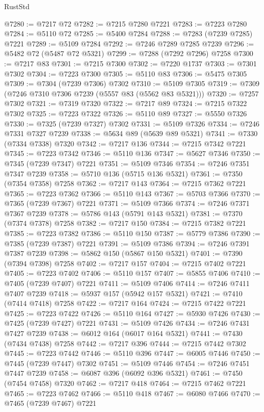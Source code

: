 \begin{lexlean}{RustStd}
\begin{coremodule}
@7280 := @7217 @72
@7282 := @7215 @7280 @7221
@7283 := @7223 @7280
@7284 := @5110 @72
@7285 := @5400 @7284
@7288 := @7283 (@7239 @7285) @7221
@7289 := @5109 @7284
@7292 := @7246 @7289 @7285 @7239
@7296 := @5482 @72 (@5487 @72 @5321)
@7299 := @7288 (@7292 @7296) @7258
@7300 := @7217 @83
@7301 := @7215 @7300
@7302 := @7220 @1737
@7303 := @7301 @7302
@7304 := @7223 @7300
@7305 := @5110 @83
@7306 := @5475 @7305
@7309 := @7304 (@7239 @7306) @7302
@7310 := @5109 @7305
@7319 := @7309 (@7246 @7310 @7306 @7239 (@5557 @83 (@5562 @83 @5321)))
@7320 := @7257 @7302
@7321 := @7319 @7320
@7322 := @7217 @89
@7324 := @7215 @7322 @7302
@7325 := @7223 @7322
@7326 := @5110 @89
@7327 := @5550 @7326
@7330 := @7325 (@7239 @7327) @7302
@7331 := @5109 @7326
@7334 := @7246 @7331 @7327 @7239
@7338 := @5634 @89 (@5639 @89 @5321)
@7341 := @7330 (@7334 @7338) @7320
@7342 := @7217 @136
@7344 := @7215 @7342 @7221
@7345 := @7223 @7342
@7346 := @5110 @136
@7347 := @5627 @7346
@7350 := @7345 (@7239 @7347) @7221
@7351 := @5109 @7346
@7354 := @7246 @7351 @7347 @7239
@7358 := @5710 @136 (@5715 @136 @5321)
@7361 := @7350 (@7354 @7358) @7258
@7362 := @7217 @143
@7364 := @7215 @7362 @7221
@7365 := @7223 @7362
@7366 := @5110 @143
@7367 := @5703 @7366
@7370 := @7365 (@7239 @7367) @7221
@7371 := @5109 @7366
@7374 := @7246 @7371 @7367 @7239
@7378 := @5786 @143 (@5791 @143 @5321)
@7381 := @7370 (@7374 @7378) @7258
@7382 := @7217 @150
@7384 := @7215 @7382 @7221
@7385 := @7223 @7382
@7386 := @5110 @150
@7387 := @5779 @7386
@7390 := @7385 (@7239 @7387) @7221
@7391 := @5109 @7386
@7394 := @7246 @7391 @7387 @7239
@7398 := @5862 @150 (@5867 @150 @5321)
@7401 := @7390 (@7394 @7398) @7258
@7402 := @7217 @157
@7404 := @7215 @7402 @7221
@7405 := @7223 @7402
@7406 := @5110 @157
@7407 := @5855 @7406
@7410 := @7405 (@7239 @7407) @7221
@7411 := @5109 @7406
@7414 := @7246 @7411 @7407 @7239
@7418 := @5937 @157 (@5942 @157 @5321)
@7421 := @7410 (@7414 @7418) @7258
@7422 := @7217 @164
@7424 := @7215 @7422 @7221
@7425 := @7223 @7422
@7426 := @5110 @164
@7427 := @5930 @7426
@7430 := @7425 (@7239 @7427) @7221
@7431 := @5109 @7426
@7434 := @7246 @7431 @7427 @7239
@7438 := @6012 @164 (@6017 @164 @5321)
@7441 := @7430 (@7434 @7438) @7258
@7442 := @7217 @396
@7444 := @7215 @7442 @7302
@7445 := @7223 @7442
@7446 := @5110 @396
@7447 := @6005 @7446
@7450 := @7445 (@7239 @7447) @7302
@7451 := @5109 @7446
@7454 := @7246 @7451 @7447 @7239
@7458 := @6087 @396 (@6092 @396 @5321)
@7461 := @7450 (@7454 @7458) @7320
@7462 := @7217 @418
@7464 := @7215 @7462 @7221
@7465 := @7223 @7462
@7466 := @5110 @418
@7467 := @6080 @7466
@7470 := @7465 (@7239 @7467) @7221

\end{coremodule}
\end{lexlean}

